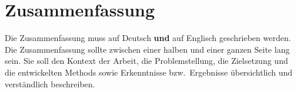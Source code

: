 
\chapter*{Zusammenfassung}
Die Zusammenfassung muss auf Deutsch \textbf{und} auf Englisch geschrieben
werden. Die Zusammenfassung sollte zwischen einer halben und einer
ganzen Seite lang sein. Sie soll den Kontext der Arbeit, die
Problemstellung, die Zielsetzung und die entwickelten Methods sowie
Erkenntnisse bzw.~Ergebnisse übersichtlich und verständlich
beschreiben.
